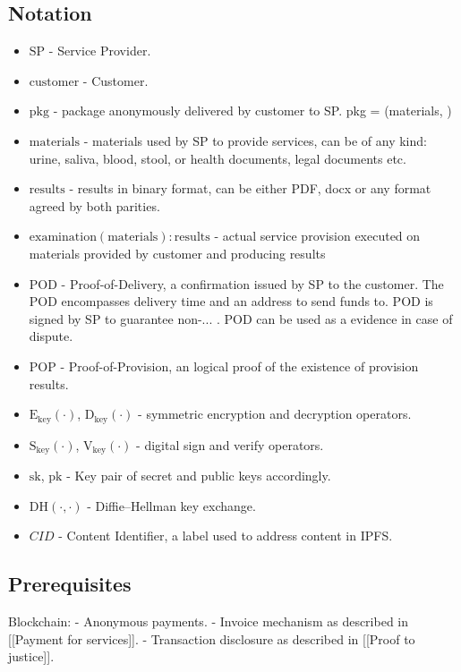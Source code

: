 \documentclass{article}
\begin{document}
\subsection{Notation}
\begin{itemize}
    \item $\mathrm{SP}$ - Service Provider.
    \item $\mathrm{customer}$ - Customer.
    \item $\mathrm{pkg}$ - package anonymously delivered by customer to SP. pkg = (materials, )
    \item $\mathrm{materials}$ - materials used by SP to provide services, can be of any kind: urine, saliva, blood, stool, or health documents, legal documents etc.
    \item $\mathrm{results}$ - results in binary format, can be either PDF, docx or any format agreed by both parities. 
    \item $\mathrm{examination}(\mathrm{materials}) : \mathrm{results}$ - actual service provision executed on materials provided by customer and producing results
    \item $\mathrm{POD}$ - Proof-of-Delivery, a confirmation issued by SP to the customer. The POD encompasses delivery time and an address to send funds to. POD is signed by SP to guarantee non-... .  POD can be used as a evidence in case of dispute.
    \item $\mathrm{POP}$ - Proof-of-Provision, an logical proof of the existence of provision results.
    \item $\mathrm{E}_\mathrm{key}(\cdot)$, $\mathrm{D}_\mathrm{key}(\cdot)$ - symmetric encryption and decryption operators.
    \item $\mathrm{S}_\mathrm{key}(\cdot)$, $\mathrm{V}_\mathrm{key}(\cdot)$ - digital sign and verify operators.
    \item $\mathrm{sk}$, $\mathrm{pk}$ - Key pair of secret and public keys accordingly.
    \item $\mathrm{DH}(\cdot, \cdot)$ - Diffie–Hellman key exchange.
    \item $CID$ - Content Identifier, a label used to address content in IPFS.
\end{itemize}

\subsection{Prerequisites}
Blockchain:
- Anonymous payments.
- Invoice mechanism as described in [[Payment for services]].
- Transaction disclosure as described in [[Proof to justice]].
\end{document}
